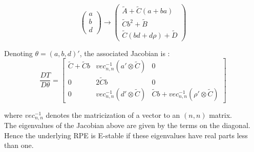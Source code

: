 \documentclass[12pt,reqno]{article}
\numberwithin{equation}{section}
\begin{document}
$$
\begin{pmatrix} a \\ b \\ d \end{pmatrix} \rightarrow \begin{pmatrix} \tilde{A} + \tilde{C} (a+ba) \\ \tilde{C} b^2 + \tilde{B} \\  \tilde{C} (bd+d \rho) + \tilde{D} \end{pmatrix}
$$

Denoting $\theta = (a,b,d)' $, the associated Jacobian is : \\

$$ \frac{ D T } { D\theta }  = \begin{bmatrix} \tilde{C} + \tilde{C} b & vec_{n,n}^{-1} (a' \otimes \tilde{C}) & 0 \\
0 & 2 \tilde{C} b & 0 \\
0 & vec_{n,n}^{-1}(d' \otimes \tilde{C} ) & \tilde{C} b + vec_{n,n}^{-1} (\rho' \otimes \tilde{C} ) \end{bmatrix} $$

where $ vec_{n,n}^{-1} $ denotes the matricization of a vector to an $(n,n) $ matrix. \\

The eigenvalues of the Jacobian above are given by the terms on the diagonal. Hence the underlying RPE is E-stable if these eigenvalues have real parts less than one. \\

\end{document}
